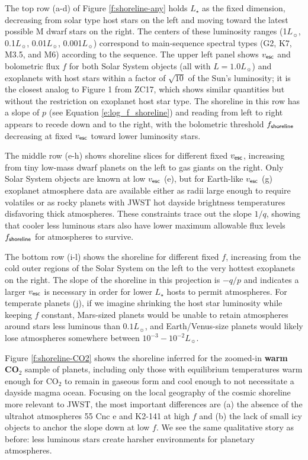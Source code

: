 \documentclass[modern,linenumbers,trackchanges]{aastex7}
\begin{document}
The top row (a-d) of Figure \ref{f:shoreline-any} holds $L_\star$ as the fixed dimension, decreasing from solar type host stars on the left and moving toward the latest possible M dwarf stars on the right. The centers of these luminosity ranges (1$L_\sun$, 0.1$L_\sun$, 0.01$L_\sun$, 0.001$L_\sun$) correspond to main-sequence spectral types (G2, K7, M3.5, and M6) according to the \citet{pecautINTRINSICCOLORSTEMPERATURES2013} sequence. The upper left panel shows $v_{\sf esc}$ and bolometric flux $f$ for both Solar System objects (all with $L = 1.0L_\sun$) and exoplanets with host stars within a factor of $\sqrt{10}$ of the Sun's luminosity; it is the closest analog to Figure 1 from ZC17, which shows similar quantities but without the restriction on exoplanet host star type. The shoreline in this row has a slope of $p$ (see Equation \ref{e:log_f_shoreline}) and reading from left to right appears to recede \citep[to borrow a visual metaphor from][]{passRecedingCosmicShoreline2025} down and to the right, with the bolometric threshold $f_{\sf shoreline}$ decreasing at fixed $v_{\sf esc}$ toward lower luminosity stars. 

The middle row (e-h) shows shoreline slices for different fixed $v_{\sf esc}$, increasing from tiny low-mass dwarf planets on the left to gas giants on the right. Only Solar System objects are known at low $v_{\sf esc}$ (e), but for Earth-like $v_{\sf esc}$ (g) exoplanet atmosphere data are available either as radii large enough to require volatiles or as rocky planets with JWST hot dayside brightness temperatures disfavoring thick atmospheres. These constraints trace out the slope $1/q$, showing that cooler less luminous stars also have lower maximum allowable flux levels $f_{\sf shoreline}$ for atmospheres to survive. 

The bottom row (i-l) shows the shoreline for different fixed $f$, increasing from the cold outer regions of the Solar System on the left to the very hottest exoplanets on the right. The slope of the shoreline in this projection is $-q/p$ and indicates a larger $v_{\sf esc}$ is necessary in order for lower $L_\star$ hosts to permit atmospheres. For temperate planets (j), if we imagine shrinking the host star luminosity while keeping $f$ constant, Mars-sized planets would be unable to retain atmospheres around stars less luminous than $0.1 L_\sun$, and Earth/Venus-size planets would likely lose atmospheres somewhere between $10^{-3} - 10^{-2} L_\sun$.

Figure \ref{f:shoreline-CO2} shows the shoreline inferred for the zoomed-in {\bf warm CO$_2$} sample of planets, including only those with equilibrium temperatures warm enough for CO$_2$ to remain in gaseous form and cool enough to not necessitate a dayside magma ocean. Focusing on the local geography of the cosmic shoreline more relevant to JWST, the most important differences are (a) the absence of the ultrahot atmospheres 55 Cnc e and K2-141 at high $f$ and (b) the lack of small icy objects to anchor the slope down at low $f$. We see the same qualitative story as before: less luminous stars create harsher environments for planetary atmospheres. 
\end{document}
